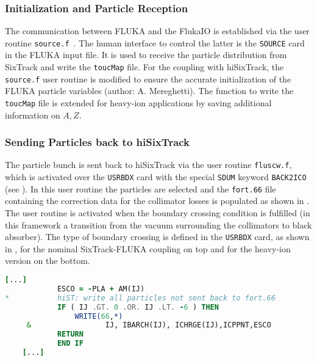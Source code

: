 \begin{appendices}
\subsubsection{Initialization and Particle Reception}

The communication between FLUKA and the FlukaIO is established via the user routine \texttt{source.f}~\cite{couplingtwiki}. The human interface to control the latter is the \texttt{SOURCE} card in the FLUKA input file. It is used to receive the particle distribution from SixTrack and write the \texttt{toucMap} file.  For the coupling with hiSixTrack, the \texttt{source.f} user routine is modified to ensure the accurate initialization of the FLUKA particle variables (author: A. Mereghetti). The function to write the \texttt{toucMap} file is extended for heavy-ion applications by saving additional information on $A,Z$.

\subsubsection{Sending Particles back to hiSixTrack} \label{chap:correctionfile}

The particle bunch is sent back to hiSixTrack via the user routine \texttt{fluscw.f}, which is activated over the \texttt{USRBDX} card with the special \texttt{SDUM} keyword \texttt{BACK2ICO} (see \cite{couplingtwiki}). In this user routine the particles are selected and the \texttt{fort.66} file containing the correction data for the collimator losses is populated as shown in . The user routine is activated when the boundary crossing condition is fulfilled (in this framework a transition from the vacuum surrounding the collimators to black absorber). The type of boundary crossing is defined in the \texttt{USRBDX} card, as shown in , for the nominal SixTrack-FLUKA coupling on top and for the heavy-ion version on the bottom. 

\vspace{0.5cm}
\begin{minipage}{\linewidth}
\begin{lstlisting}[language=Fortran,caption=Particle selection in the \texttt{fluscw.f} user routine to write the data to the collimator loss correction file \texttt{fort.66}.,label=lst:fluscw]
     [...]
            ESCO = -PLA + AM(IJ)
*           hiST: write all particles not sent back to fort.66
            IF ( IJ .GT. 0 .OR. IJ .LT. -6 ) THEN
                WRITE(66,*) 
     &                 IJ, IBARCH(IJ), ICHRGE(IJ),ICPPNT,ESCO
            RETURN
            END IF
    [...]
\end{lstlisting}
\end{minipage}


\end{appendices}
